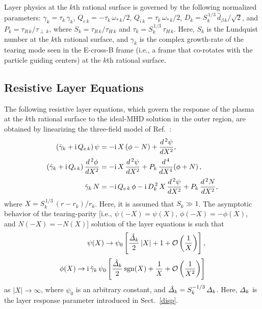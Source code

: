 \documentclass[12pt,prb,aps]{revtex4-1}
\begin{document}
Layer physics at the $k$th rational surface is governed by the following normalized parameters:
$\hat{\gamma}_k= \tau_k\,\gamma_k$, 
$Q_{e\,k }= - \tau_k\,\omega_{\ast\,k}/2$, 
$Q_{i\,k }=  \tau_k\,\omega_{\ast\,k}/2$, 
$D_k = S_{k}^{\,1/3}\,\hat{d}_{\beta\,k}/\sqrt{2}$, 
and $P_{k} = \tau_{R\,k}/\tau_{\perp\,k}$, 
where $S_k = \tau_{R\,k}/\tau_{H\,k}$ and 
$\tau_k = S_k^{\,1/3} \,\tau_{H\,k}$.   Here, $S_k$ is the Lundquist number at the $k$th rational surface, and $\gamma_k$ is the complex growth-rate of the tearing mode seen in the E-cross-B frame (i.e., a frame that co-rotates with the
particle guiding centers) at the $k$th rational surface.

\subsection{Resistive Layer Equations}\label{rlayer}
The following resistive layer equations, which govern the response of the plasma at the $k$th rational surface to the ideal-MHD solution in the outer region,  are obtained by linearizing the three-field model of Ref.~:
\begin{align}\label{e80y}
(\hat{\gamma}_k+{\rm i}\,Q_{e\,k})\,\psi&= - {\rm i}\,X\left(\phi-N\right) + \frac{d^{\,2}\psi}{d X^2},\\[0.5ex]
(\hat{\gamma}_k+{\rm i}\,Q_{i\,k})\,\frac{d^{\,2}\phi}{d X^2}&= - {\rm i}\,X\,\frac{d^{\,2}\psi}{d X^2}+ P_{k}\,\frac{d^{\,4}}{d X^4}\!\left(\phi + N\right),\\[0.5ex]
\hat{\gamma}_k\,N&= - {\rm i}\,Q_{e\,k}\,\phi  - {\rm i} \,D_k^{\,2}\,X\,\frac{d^{\,2}\psi}{d X^{2}}
+ P_{k}\,\frac{d^{\,2} N}{d X^{2}},\label{e82y}
\end{align}
where $X=S_k^{\,1/3}\,(r-r_k)/r_k$. Here, it is assumed that $S_k\gg 1$.  The asymptotic behavior of the tearing-parity [i.e., $\psi(-X)=\psi(X)$, $\phi(-X)= -\phi(X)$, and $N(-X)=-N(X)$] solution of the layer
equations is such that
\begin{align}\label{e47y}
\psi(X)\rightarrow  \psi_0\left[\frac{\hat{\mit\Delta}_k}{2}\,|X| +1 + {\cal O}\left(\frac{1}{X}\right)\right],\\[0.5ex]
\phi(X)\rightarrow  {\rm i}\,\hat{\gamma}_k\,\psi_0\left[\frac{\hat{\mit\Delta}_k}{2}\,{\rm sgn}(X) +\frac{1}{X} + {\cal O}\left(\frac{1}{X^2}\right)\right]\label{e85y}
\end{align}
as $|X|\rightarrow\infty$, where $\psi_0$ is an arbitrary constant, and 
$\hat{\mit\Delta}_k = S_k^{-1/3}\,{\mit\Delta}_k$. Here, ${\mit\Delta}_k$ is the layer response parameter introduced in Sect.~\ref{disp}. 
\end{document}
